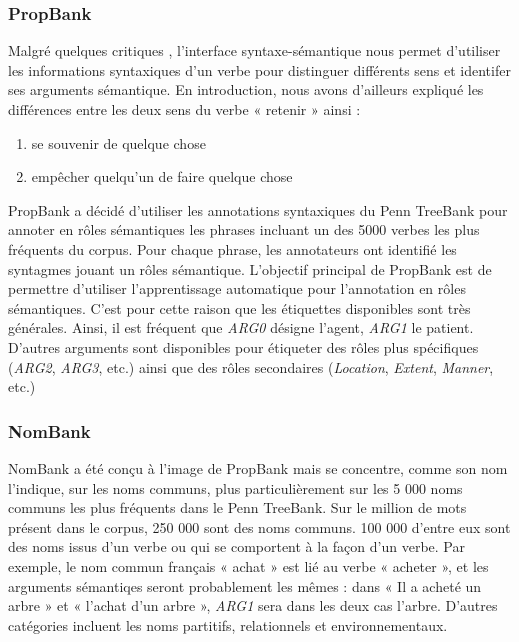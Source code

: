 \subsubsection{PropBank}

Malgré quelques critiques \citep{riemer2011conception}, l'interface
syntaxe-sémantique nous permet d'utiliser les informations syntaxiques d'un
verbe pour distinguer différents sens et identifer ses arguments sémantique. En
introduction, nous avons d'ailleurs expliqué les différences entre les deux
sens du verbe « retenir » ainsi :

\begin{enumerate}
    \item se souvenir de quelque chose
    \item empêcher quelqu'un de faire quelque chose
\end{enumerate}

PropBank \citep{palmer2005proposition} a décidé d'utiliser les annotations
syntaxiques du Penn TreeBank \citep{marcus1993building} pour annoter en rôles
sémantiques les phrases incluant un des 5000 verbes les plus fréquents du
corpus. Pour chaque phrase, les annotateurs ont identifié les syntagmes jouant
un rôles sémantique. L'objectif principal de PropBank est de permettre
d'utiliser l'apprentissage automatique pour l'annotation en rôles sémantiques.
C'est pour cette raison que les étiquettes disponibles sont très générales.
Ainsi, il est fréquent que \textit{ARG0} désigne l'agent, \textit{ARG1} le
patient. D'autres arguments sont disponibles pour étiqueter des rôles plus
spécifiques (\textit{ARG2}, \textit{ARG3}, etc.) ainsi que des rôles
secondaires (\textit{Location}, \textit{Extent}, \textit{Manner}, etc.)

\subsubsection{NomBank}

NomBank \citep{meyers2004nombank} a été conçu à l'image de PropBank mais se
concentre, comme son nom l'indique, sur les noms communs, plus particulièrement
sur les 5 000 noms communs les plus fréquents dans le Penn TreeBank. Sur le
million de mots présent dans le corpus, 250 000 sont des noms communs. 100 000
d'entre eux sont des noms issus d'un verbe ou qui se comportent à la façon d'un
verbe. Par exemple, le nom commun français « achat » est lié au verbe « acheter
», et les arguments sémantiqes seront probablement les mêmes : dans « Il a
acheté un arbre » et « l'achat d'un arbre », \textit{ARG1} sera dans les deux
cas l'arbre. D'autres catégories incluent les noms partitifs, relationnels et
environnementaux.

